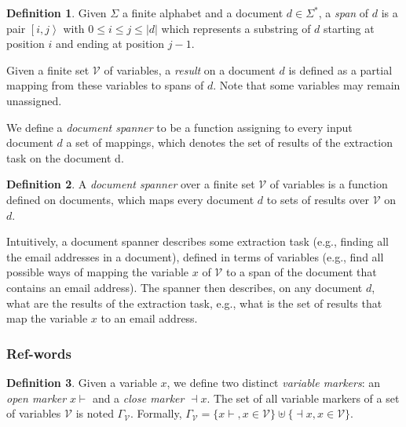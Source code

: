 \documentclass[12px]{article}
\theoremstyle{definition}
\newtheorem{definition}{Definition}
\newcommand{\Span}[1]{\left[ #1 \right\rangle}
\begin{document}
        \begin{definition}
          Given $\Sigma$ a finite alphabet and a document $d \in \Sigma^*$, a
          \textit{span} of $d$ is a pair $\Span{i, j}$ with $0 \leq i \leq j
          \leq |d|$ which represents a substring of $d$ starting at position
          $i$ and ending at position $j - 1$.
        \end{definition}

        Given a finite set $\mathcal{V}$ of variables, a \textit{result} on a
        document $d$ is defined as a partial mapping from these variables to
        spans of $d$. Note that some variables may remain unassigned.

        We define a \textit{document spanner} to be a function assigning to
        every input document $d$ a set of mappings, which denotes the set of
        results of the extraction task on the document d.

        \begin{definition}
          A \textit{document spanner} over a finite set $\mathcal{V}$ of
          variables is a function defined on documents, which maps every
          document $d$ to sets of results over $\mathcal{V}$ on $d$.
        \end{definition}

        Intuitively, a document spanner describes some extraction task (e.g.,
        finding all the email addresses in a document), defined in terms of
        variables (e.g., find all possible ways of mapping the variable $x$ of
        $\mathcal{V}$ to a span of the document that contains an email
        address).  The spanner then describes, on any document $d$, what are
        the results of the extraction task, e.g., what is the set of results
        that map the variable $x$ to an email address.


      \subsubsection{Ref-words}


        \begin{definition}
          Given a variable $x$, we define two distinct \textit{variable
          markers}: an \textit{open marker} $x{\vdash}$ and a \textit{close
          marker} ${\dashv}x$. The set of all variable markers of a set of
          variables $\mathcal{V}$ is noted $\Gamma_\mathcal{V}$. Formally,
          $\Gamma_\mathcal{V} = \{x{\vdash}, x \in \mathcal{V}\} \uplus
          \{{\dashv}x, x \in \mathcal{V}\}$.
        \end{definition}
\end{document}
